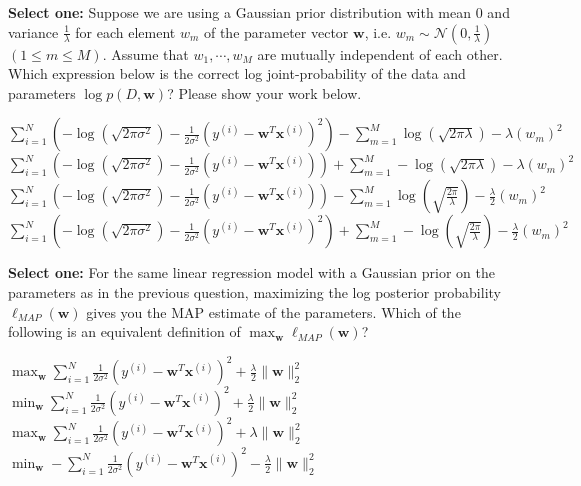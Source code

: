 \documentclass[11pt,addpoints,answers]{exam}
\newcommand{\sone}{\textbf{Select one: }}
\begin{document}
\begin{questions}
\begin{parts}
\begin{subparts}
    \subpart[2] \sone Suppose we are using a Gaussian prior distribution with mean $0$ and variance $\frac{1}{\lambda}$ for each element $w_m$  of the parameter vector $\mathbf{w}$, i.e. $w_m \sim \mathcal{N}\left(0, \frac{1}{\lambda}\right)$ $(1 \leq m \leq M )$. Assume that $w_1, \cdots, w_M$ are mutually independent of each other. Which expression below is the correct log joint-probability of the data and parameters $\log p(D, \mathbf{w})$?  Please show your work below.
    \begin{checkboxes}
        \choice $\sum_{i=1}^N\left(-\log (\sqrt{2\pi\sigma^2}) - \frac{1}{2\sigma^2} (y^{(i)} - \mathbf{w}^T\mathbf{x}^{(i)})^2\right) - \sum_{m=1}^M \log(\sqrt{2\pi\lambda}) - \lambda (w_m)^2$
        \choice $\sum_{i=1}^N\left(-\log (\sqrt{2\pi\sigma^2}) - \frac{1}{2\sigma^2} (y^{(i)} - \mathbf{w}^T\mathbf{x}^{(i)})\right) + \sum_{m=1}^M -\log(\sqrt{2\pi\lambda}) - \lambda (w_m)^2$
        \choice $\sum_{i=1}^N\left(-\log (\sqrt{2\pi\sigma^2}) - \frac{1}{2\sigma^2} (y^{(i)} - \mathbf{w}^T\mathbf{x}^{(i)})\right) -  \sum_{m=1}^M \log(\sqrt{\frac{2\pi}{\lambda}}) - \frac{\lambda}{2}(w_m)^2$
        \choice $\sum_{i=1}^N\left(-\log (\sqrt{2\pi\sigma^2}) - \frac{1}{2\sigma^2} (y^{(i)} - \mathbf{w}^T\mathbf{x}^{(i)})^2\right) +  \sum_{m=1}^M -\log(\sqrt{\frac{2\pi}{\lambda}}) - \frac{\lambda}{2}(w_m)^2$
    \end{checkboxes}
    
     \begin{your_solution}[title=Work,height=8cm]
    \end{your_solution}
        
    
    \newpage
    \subpart[2] \sone For the same linear regression model with a Gaussian prior on the parameters as in the previous question, maximizing the log posterior probability  $\ell_{\textit{MAP}}(\mathbf{w})$ gives you the MAP estimate of the parameters.
    Which of the following is an equivalent definition of  $\max_{\mathbf{w}} \ell_{\textit{MAP}}(\mathbf{w})$?
    \begin{checkboxes}
        \choice $\max_{\mathbf{w}} \sum_{i=1}^N\frac{1}{2\sigma^2} (y^{(i)} - \mathbf{w}^T\mathbf{x}^{(i)})^2 + \frac{\lambda}{2}\|\mathbf{w}\|_2^2$
        \choice $\min_{\mathbf{w}} \sum_{i=1}^N\frac{1}{2\sigma^2} (y^{(i)} - \mathbf{w}^T\mathbf{x}^{(i)})^2 + \frac{\lambda}{2}\|\mathbf{w}\|_2^2$
        \choice $\max_{\mathbf{w}} \sum_{i=1}^N\frac{1}{2\sigma^2} (y^{(i)} - \mathbf{w}^T\mathbf{x}^{(i)})^2 + \lambda\|\mathbf{w}\|_2^2$
        \choice $\min_{\mathbf{w}} - \sum_{i=1}^N\frac{1}{2\sigma^2} (y^{(i)} - \mathbf{w}^T\mathbf{x}^{(i)})^2 - \frac{\lambda}{2}\|\mathbf{w}\|_2^2$
    \end{checkboxes}
    

\end{subparts}
\end{parts}
\end{questions}
\end{document}
